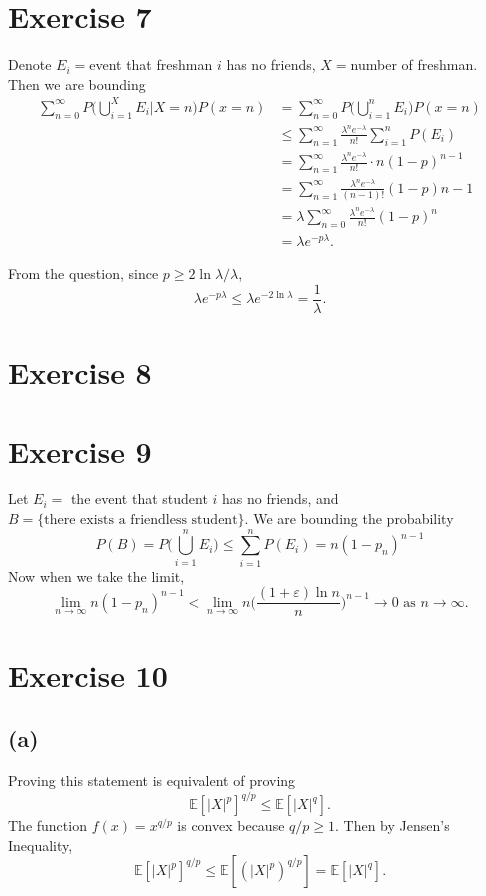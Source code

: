 \documentclass{article}
\begin{document}
\section*{Exercise 7}
Denote $E_i = $event that freshman $i$ has no friends, $X = $number of freshman. Then we are bounding
\begin{align*}
	\sum_{n = 0}^{\infty} P \biggl( \bigcup_{i = 1}^X E_i \bigg| X = n \biggr) P(x = n)
	&= \sum_{n = 0}^{\infty} P \biggl( \bigcup_{i = 1}^n E_i \biggr) P(x = n) \\
	&\leq \sum_{n = 1}^{\infty} \frac{\lambda^n e^{-\lambda}}{n!} \sum_{i = 1}^{n} P(E_i) \\
	&= \sum_{n = 1}^{\infty} \frac{\lambda^n e^{-\lambda}}{n!} \cdot n(1 - p)^{n - 1} \\
	&= \sum_{n = 1}^{\infty} \frac{\lambda^n e^{-\lambda}}{(n - 1)!} (1 - p){n - 1} \\
	&= \lambda \sum_{n = 0}^{\infty} \frac{\lambda^n e^{-\lambda}}{n!}(1 - p)^n \\
	&= \lambda e^{-p \lambda}.
\end{align*}

From the question, since $p \geq 2 \ln{\lambda} / \lambda$, 
\[ \lambda e^{-p \lambda} \leq \lambda e^{-2 \ln{\lambda}} = \frac{1}{\lambda}. \]


\newpage
\section*{Exercise 8}
	

\newpage
\section*{Exercise 9}
Let $E_i = $ the event that student $i$ has no friends, and 
$B = \{ \text{there exists a friendless student} \}$. We are bounding the probability 
\[ P(B) 
= P \biggl( \bigcup_{i = 1}^n E_i \biggr) 
\leq \sum_{i = 1}^{n} P(E_i) 
= n(1 - p_n)^{n - 1}
\]
Now when we take the limit, 
\[ \lim_{n \to \infty} n(1 - p_n)^{n - 1} 
< \lim_{n \to \infty} n \biggl( \frac{(1 + \varepsilon) \ln{n}}{n} \biggr)^{n - 1} 
\to 0 \text{  as  } n \to \infty. \]


\newpage
\section*{Exercise 10}
\subsection*{(a)}
Proving this statement is equivalent of proving 
\[ \mathbb{E}[|X|^p]^{q / p} \leq \mathbb{E}[|X|^q]. \]
The function $f(x) = x^{q / p}$ is convex because $q / p \geq 1$. Then by Jensen's Inequality, 
\[ \mathbb{E}[|X|^p]^{q / p} \leq \mathbb{E}[(|X|^p)^{q / p}] = \mathbb{E}[|X|^q]. \]
\end{document}
